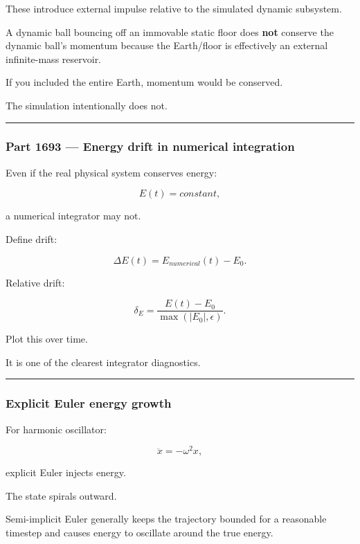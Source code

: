 These introduce external impulse relative to the simulated dynamic subsystem.

A dynamic ball bouncing off an immovable static floor does \textbf{not} conserve the dynamic ball's momentum because the Earth/floor is effectively an external infinite-mass reservoir.

If you included the entire Earth, momentum would be conserved.

The simulation intentionally does not.

\begin{center}\rule{0.5\linewidth}{0.5pt}\end{center}

\subsubsection{Part 1693 --- Energy drift in numerical integration}\label{part-1693-energy-drift-in-numerical-integration}

Even if the real physical system conserves energy:

\[
E(t)=constant,
\]

a numerical integrator may not.

Define drift:

\[
\boxed{
\Delta E(t)
=
E_{numerical}(t)-E_0.
}
\]

Relative drift:

\[
\boxed{
\delta_E
=
\frac{E(t)-E_0}
{\max(|E_0|,\epsilon)}.
}
\]

Plot this over time.

It is one of the clearest integrator diagnostics.

\begin{center}\rule{0.5\linewidth}{0.5pt}\end{center}

\subsubsection{Explicit Euler energy growth}\label{explicit-euler-energy-growth}

For harmonic oscillator:

\[
\ddot x=-\omega^2x,
\]

explicit Euler injects energy.

The state spirals outward.

Semi-implicit Euler generally keeps the trajectory bounded for a reasonable timestep and causes energy to oscillate around the true energy.

